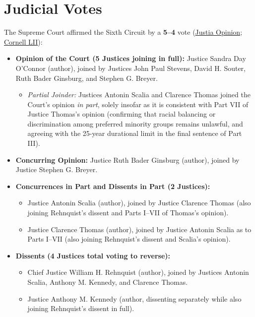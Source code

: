 \documentclass[12pt]{article}
\begin{document}
\section{Judicial Votes}
The Supreme Court affirmed the Sixth Circuit by a \textbf{5--4} vote (\href{https://supreme.justia.com/cases/federal/us/539/306/}{Justia Opinion}; \href{https://www.law.cornell.edu/supremecourt/text/02-241}{Cornell LII}):
\begin{itemize}
    \item \textbf{Opinion of the Court (5 Justices joining in full):} Justice Sandra Day O'Connor (author), joined by Justices John Paul Stevens, David H. Souter, Ruth Bader Ginsburg, and Stephen G. Breyer.
    \begin{itemize}
        \item \textit{Partial Joinder:} Justices Antonin Scalia and Clarence Thomas joined the Court's opinion \textit{in part}, solely insofar as it is consistent with Part VII of Justice Thomas's opinion (confirming that racial balancing or discrimination among preferred minority groups remains unlawful, and agreeing with the 25-year durational limit in the final sentence of Part III).
    \end{itemize}
    \item \textbf{Concurring Opinion:} Justice Ruth Bader Ginsburg (author), joined by Justice Stephen G. Breyer.
    \item \textbf{Concurrences in Part and Dissents in Part (2 Justices):}
    \begin{itemize}
        \item Justice Antonin Scalia (author), joined by Justice Clarence Thomas (also joining Rehnquist's dissent and Parts I--VII of Thomas's opinion).
        \item Justice Clarence Thomas (author), joined by Justice Antonin Scalia as to Parts I--VII (also joining Rehnquist's dissent and Scalia's opinion).
    \end{itemize}
    \item \textbf{Dissents (4 Justices total voting to reverse):}
    \begin{itemize}
        \item Chief Justice William H. Rehnquist (author), joined by Justices Antonin Scalia, Anthony M. Kennedy, and Clarence Thomas.
        \item Justice Anthony M. Kennedy (author, dissenting separately while also joining Rehnquist's dissent in full).
    \end{itemize}
\end{itemize}
\end{document}
